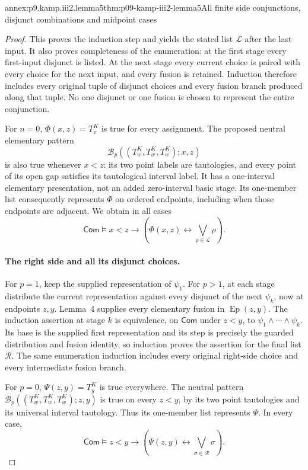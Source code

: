 \begin{annexitem}{annex:p9.kamp.iii2.lemma5}{thm:p09-kamp-iii2-lemma5}{All finite side conjunctions, disjunct combinations and midpoint cases}
\begin{proof}
This proves the induction step and yields the stated list
\(\mathcal L\) after the last input. It also proves completeness
of the enumeration: at the first stage every first-input disjunct is
listed. At the next stage every current choice is paired with every
choice for the next input, and every fusion is retained. Induction
therefore includes every original tuple of disjunct choices and every
fusion branch produced along that tuple. No one disjunct or one
fusion is chosen to represent the entire conjunction.

For \(n=0\), \(\Phi(x,z)=T^K_x\) is true for every assignment.
The proposed neutral elementary pattern
\[
                 \mathcal B_p((T^K_w,T^K_w,T^K_w);x,z)
\]
is also true whenever \(x<z\): its two point labels are tautologies,
and every point of its open gap satisfies its tautological interval
label. It has a one-interval elementary presentation, not an added
zero-interval basic stage. Its one-member list consequently represents
\(\Phi\) on ordered endpoints, including when those endpoints are
adjacent. We obtain in all cases
\[
 \mathsf{Com}\models x<z\longrightarrow
              \left(\Phi(x,z)\longleftrightarrow
                                      \bigvee_{\rho\in\mathcal L}\rho\right).
\]

\paragraph{The right side and all its disjunct choices.}
For \(p=1\), keep the supplied representation of \(\psi_1\).
For \(p>1\), at each stage distribute the current representation
against every disjunct of the next \(\psi_k\), now at endpoints
\(z,y\). Lemma~4 supplies every elementary fusion in
\(\operatorname{Ep}(z,y)\). The induction assertion at stage \(k\)
is equivalence, on \(\mathsf{Com}\) under \(z<y\), to
\(\psi_1\land\cdots\land\psi_k\). Its base is the supplied first
representation and its step is precisely the guarded distribution and
fusion identity, so induction proves the assertion for the final list
\(\mathcal R\). The same enumeration induction includes every original
right-side choice and every intermediate fusion branch.

For \(p=0\), \(\Psi(z,y)=T^K_y\) is true everywhere. The neutral
pattern
\(\mathcal B_p((T^K_w,T^K_w,T^K_w);z,y)\)
is true on every \(z<y\), by its two point tautologies and its
universal interval tautology. Thus its one-member list represents
\(\Psi\). In every case,
\[
 \mathsf{Com}\models z<y\longrightarrow
              \left(\Psi(z,y)\longleftrightarrow
                                    \bigvee_{\sigma\in\mathcal R}\sigma\right).
\]


\end{proof}
\end{annexitem}
